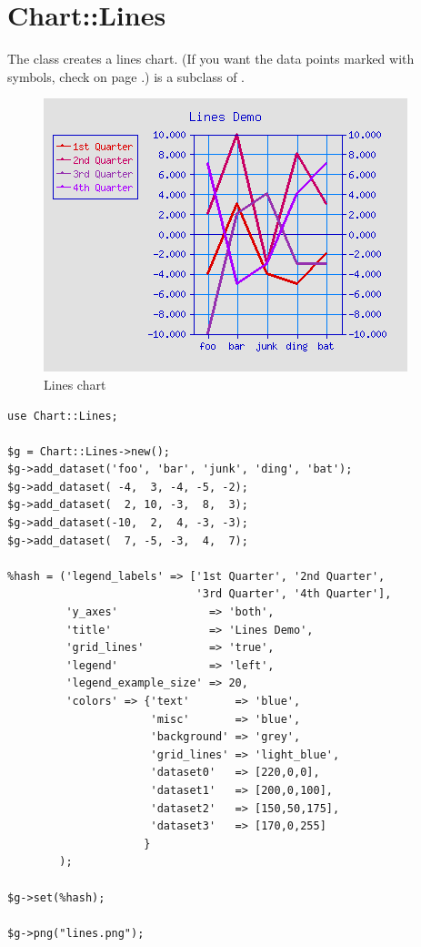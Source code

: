 %
%
\renewcommand{\thisname}{Chart::Lines}
\section{\thisname}
\name{\thisname}
\begin{Description}
The class \thisclass creates a lines chart. (If you want the data
points marked with symbols, check  on
page \pageref{Chart::LinesPoints}.) \thisclass is a subclass of
.
\end{Description}

\example
\begin{figure}[ht]
  \begin{center}
    \includegraphics[scale=0.5]{d_lines2.png}
  \end{center}
  \caption{Lines chart}
  \label{fig:lines}
\end{figure}
\begin{verbatim}
use Chart::Lines;

$g = Chart::Lines->new();
$g->add_dataset('foo', 'bar', 'junk', 'ding', 'bat');
$g->add_dataset( -4,  3, -4, -5, -2);
$g->add_dataset(  2, 10, -3,  8,  3);
$g->add_dataset(-10,  2,  4, -3, -3);
$g->add_dataset(  7, -5, -3,  4,  7);

%hash = ('legend_labels' => ['1st Quarter', '2nd Quarter',
                             '3rd Quarter', '4th Quarter'],
         'y_axes'              => 'both',
         'title'               => 'Lines Demo',
         'grid_lines'          => 'true',
         'legend'              => 'left',
         'legend_example_size' => 20,
         'colors' => {'text'       => 'blue',
                      'misc'       => 'blue',
                      'background' => 'grey',
                      'grid_lines' => 'light_blue',
                      'dataset0'   => [220,0,0],
                      'dataset1'   => [200,0,100],
                      'dataset2'   => [150,50,175],
                      'dataset3'   => [170,0,255]
                     }
        );

$g->set(%hash);

$g->png("lines.png");
\end{verbatim}

